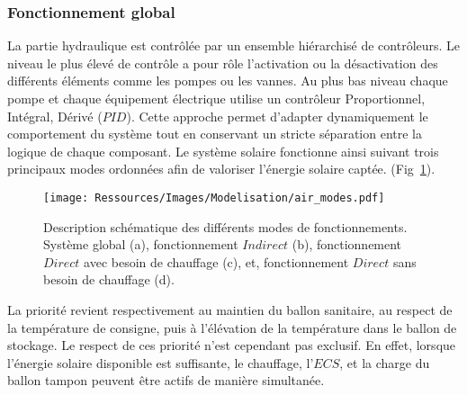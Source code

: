 \subsubsection{Fonctionnement global} %
\label{ssub:fonctionnement_global}
La partie hydraulique est contrôlée par un ensemble hiérarchisé de contrôleurs. Le niveau
le plus élevé de contrôle a pour rôle l’activation ou la désactivation des différents
éléments comme les pompes ou les vannes. Au plus bas niveau chaque pompe et chaque
équipement électrique utilise un contrôleur Proportionnel, Intégral, Dérivé ($PID$). Cette
approche permet d’adapter dynamiquement le comportement du système tout en conservant un
stricte séparation entre la logique de chaque composant. Le système solaire fonctionne
ainsi suivant trois principaux modes ordonnées afin de valoriser l’énergie solaire captée.
(Fig~\ref{fig:schema_modes}).
\begin{figure}
    \begin{center}
        \texttt{[image: Ressources/Images/Modelisation/air\_modes.pdf]}
    \end{center}
    \caption{Description schématique des différents modes de fonctionnements. Système
    global (a), fonctionnement $Indirect$ (b), fonctionnement $Direct$ avec besoin de
    chauffage (c), et, fonctionnement $Direct$ sans besoin de chauffage (d).
             \label{fig:schema_modes}}
\end{figure}

La priorité revient respectivement au maintien du ballon sanitaire, au respect de la température de
consigne, puis à l’élévation de la température dans le ballon de stockage. Le respect de
ces priorité n’est cependant pas exclusif. En effet, lorsque l’énergie solaire disponible est
suffisante, le chauffage, l’$ECS$, et la charge du ballon tampon peuvent être actifs de
manière simultanée.

